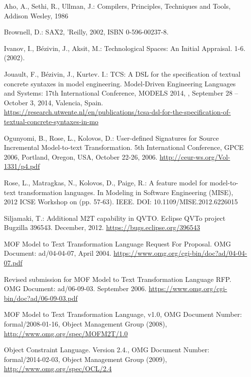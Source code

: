 \documentclass{llncs}
\begin{document}
%
\begin{thebibliography}{}
%
Aho, A., Sethi, R., Ullman, J.: Compilers, Principles, Techniques and Tools, Addison Wesley, 1986

Brownell, D.: SAX2, 'Reilly, 2002, ISBN 0-596-00237-8.

Ivanov, I., B\'ezivin, J., Aksit, M.: Technological Spaces: An Initial Appraisal. 1-6.  (2002). 

Jouault, F.,  B\'ezivin, J.,  Kurtev. I.: TCS: A DSL for the specification of textual concrete syntaxes in model engineering. Model-Driven Engineering Languages and Systems: 17th International Conference, MODELS 2014, , September 28 – October 3, 2014, Valencia, Spain.
\url{https://research.utwente.nl/en/publications/tcsa-dsl-for-the-specification-of-textual-concrete-syntaxes-in-mo}

Ogunyomi, B., Rose, L., Kolovos, D.: User-defined Signatures for Source Incremental Model-to-text Transformation. 5th International Conference, GPCE 2006, Portland, Oregon, USA, October 22-26, 2006.
\url{http://ceur-ws.org/Vol-1331/p4.pdf}

Rose, L., Matragkas, N., Kolovos, D.,  Paige, R.: A feature model for model-to-text transformation languages. In Modeling in Software Engineering (MISE), 2012 ICSE Workshop on (pp. 57-63). IEEE. DOI: 10.1109/MISE.2012.6226015

Siljamaki, T.: Additional M2T capability in QVTO. Eclipse QVTo project Bugzilla 396543. December, 2012.
\url{https://bugs.eclipse.org/396543}

MOF Model to Text Transformation Language Request For Proposal. OMG Document: ad/04-04-07, April 2004.
\url{https://www.omg.org/cgi-bin/doc?ad/04-04-07.pdf}

Revised submission for MOF Model to Text Transformation Language RFP. OMG Document: ad/06-09-03. September 2006.
\url{https://www.omg.org/cgi-bin/doc?ad/06-09-03.pdf}

MOF Model to Text Transformation Language, v1.0, OMG Document Number: formal/2008-01-16, Object Management Group (2008),  \url{http://www.omg.org/spec/MOFM2T/1.0}

Object Constraint Language. Version 2.4., OMG Document Number: formal/2014-02-03, Object Management Group (2009),  \url{http://www.omg.org/spec/OCL/2.4}


\end{thebibliography}
\end{document}
